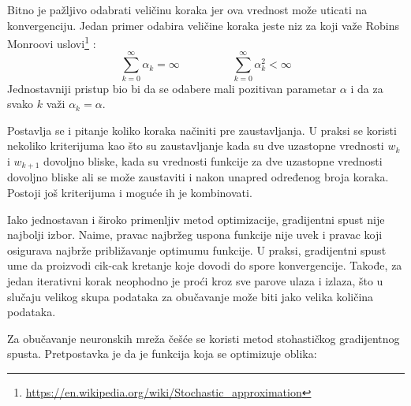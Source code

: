 Bitno je pažljivo odabrati veličinu koraka jer ova vrednost može uticati na konvergenciju. Jedan primer odabira veličine koraka jeste niz za koji važe Robins Monroovi uslovi\footnote{\url{https://en.wikipedia.org/wiki/Stochastic_approximation}} :
\begin{equation}
	 \sum_{k=0}^{\infty} \alpha_k = \infty \hspace{2cm} \sum_{k=0}^{\infty} \alpha_k^2 < \infty 
	\end{equation}
Jednostavniji pristup bio bi da se odabere mali pozitivan parametar $\alpha$ i da za svako $k$ važi $\alpha_k = \alpha$.
\par
Postavlja se i pitanje koliko koraka načiniti pre zaustavljanja. U praksi se koristi nekoliko kriterijuma kao što su zaustavljanje kada su dve uzastopne vrednosti $w_k$ i $w_{k+1}$ dovoljno bliske, kada su vrednosti funkcije za dve uzastopne vrednosti dovoljno bliske ali se može zaustaviti i nakon unapred određenog broja koraka. Postoji još kriterijuma i moguće ih je kombinovati.
\par
Iako jednostavan i široko primenljiv metod optimizacije, gradijentni spust nije najbolji izbor. Naime, pravac najbržeg uspona funkcije nije uvek i pravac koji osigurava najbrže približavanje optimumu funkcije. U praksi, gradijentni spust ume da proizvodi cik-cak kretanje koje dovodi do spore konvergencije. Takođe, za jedan iterativni korak neophodno je proći kroz sve parove ulaza i izlaza, što u slučaju velikog skupa podataka za obučavanje može biti jako velika količina podataka.
\par
Za obučavanje neuronskih mreža češće se koristi metod stohastičkog gradijentnog spusta. Pretpostavka je da je funkcija koja se optimizuje oblika:

